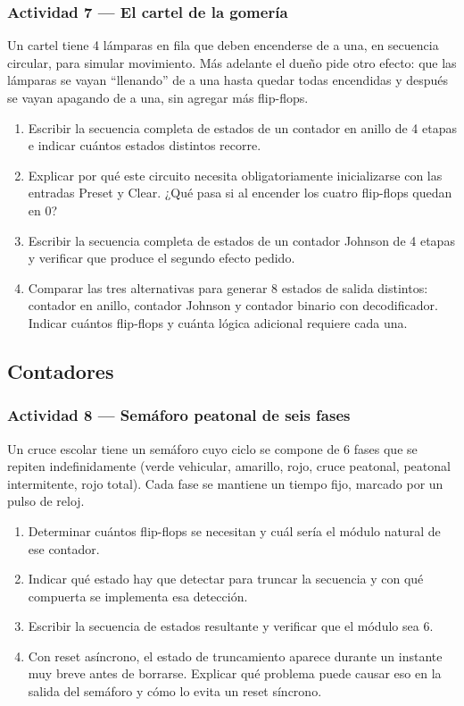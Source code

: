 \subsubsection*{Actividad 7 --- El cartel de la gomería}

Un cartel tiene 4 lámparas en fila que deben encenderse de a una, en secuencia circular, para simular movimiento. Más adelante el dueño pide otro efecto: que las lámparas se vayan ``llenando'' de a una hasta quedar todas encendidas y después se vayan apagando de a una, sin agregar más flip-flops.

\begin{enumerate}[label=\alph*)]
    \item Escribir la secuencia completa de estados de un contador en anillo de 4 etapas e indicar cuántos estados distintos recorre.
    \item Explicar por qué este circuito necesita obligatoriamente inicializarse con las entradas Preset y Clear. ¿Qué pasa si al encender los cuatro flip-flops quedan en 0?
    \item Escribir la secuencia completa de estados de un contador Johnson de 4 etapas y verificar que produce el segundo efecto pedido.
    \item Comparar las tres alternativas para generar 8 estados de salida distintos: contador en anillo, contador Johnson y contador binario con decodificador. Indicar cuántos flip-flops y cuánta lógica adicional requiere cada una.
\end{enumerate}

\subsection{Contadores}

\subsubsection*{Actividad 8 --- Semáforo peatonal de seis fases}

Un cruce escolar tiene un semáforo cuyo ciclo se compone de 6 fases que se repiten indefinidamente (verde vehicular, amarillo, rojo, cruce peatonal, peatonal intermitente, rojo total). Cada fase se mantiene un tiempo fijo, marcado por un pulso de reloj.

\begin{enumerate}[label=\alph*)]
    \item Determinar cuántos flip-flops se necesitan y cuál sería el módulo natural de ese contador.
    \item Indicar qué estado hay que detectar para truncar la secuencia y con qué compuerta se implementa esa detección.
    \item Escribir la secuencia de estados resultante y verificar que el módulo sea 6.
    \item Con reset asíncrono, el estado de truncamiento aparece durante un instante muy breve antes de borrarse. Explicar qué problema puede causar eso en la salida del semáforo y cómo lo evita un reset síncrono.
\end{enumerate}

